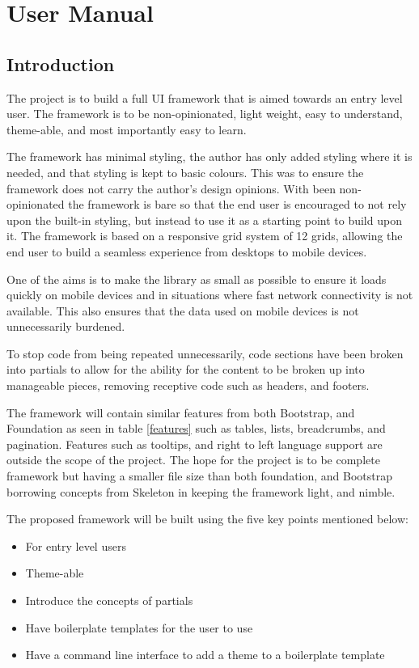 \newpage
\chapter*{User Manual}
\section*{Introduction}

The project is to build a full \gls{UI} framework that is aimed towards an entry level user. The framework is to be non-opinionated, light weight, easy to understand, theme-able, and most importantly easy to learn.

The framework has minimal styling, the author has only added styling where it is needed, and that styling is kept to basic colours. This was to ensure the framework does not carry the author's design opinions. With been non-opinionated the framework is bare so that the end user is encouraged to not rely upon the built-in styling, but instead to use it as a starting point to build upon it. The framework is based on a responsive grid system of 12 grids, allowing the end user to build a seamless experience from desktops to mobile devices.

One of the aims is to make the library as small as possible to ensure it  loads quickly on mobile devices and in situations where fast network connectivity is not available. This also ensures that the data used on mobile devices is not unnecessarily burdened.

To stop code from being repeated unnecessarily, code sections have been broken into partials to allow for the ability for the content to be broken up into manageable pieces, removing receptive code such as headers, and footers.

\newpage
The framework will contain similar features from both Bootstrap, and Foundation as seen in table \ref{features} such as tables, lists, breadcrumbs, and pagination. Features such as tooltips, and right to left language support are outside the scope of the project. The hope for the project is to be complete framework but having a smaller file size than both foundation, and Bootstrap borrowing concepts from Skeleton in keeping the framework light, and nimble. 

The proposed framework will be built using the five key points mentioned below: 
\begin{itemize}
	\item For entry level users
	\item Theme-able
	\item Introduce the concepts of partials
	\item Have boilerplate templates for the user to use
	\item Have a command line interface to add a theme to a boilerplate template
\end{itemize}
